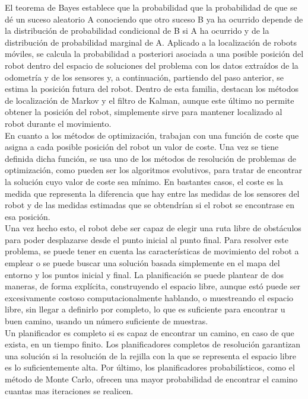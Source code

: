 El teorema de Bayes establece que la probabilidad que la probabilidad de que se dé un suceso aleatorio A conociendo que otro suceso B ya ha ocurrido depende de la distribución de probabilidad condicional de B si A ha ocurrido y de la distribución de probabilidad marginal de A. Aplicado a la localización de robots móviles, se calcula la probabilidad a posteriori asociada a una posible posición del robot dentro del espacio de soluciones del problema con los datos extraídos de la odometría y de los sensores y, a continuación, partiendo del paso anterior, se estima la posición futura del robot. Dentro de esta familia, destacan los métodos de localización de Markov y el filtro de Kalman, aunque este último no permite obtener la posición del robot, simplemente sirve para mantener localizado al robot durante el movimiento.\\

En cuanto a los métodos de optimización, trabajan con una función de coste que asigna a cada posible posición del robot un valor de coste. Una vez se tiene definida dicha función, se usa uno de los métodos de resolución de problemas de optimización, como pueden ser los algoritmos evolutivos, para tratar de encontrar la solución cuyo valor de coste sea mínimo. En bastantes casos, el coste es la medida que representa la diferencia que hay entre las medidas de los sensores del robot y de las medidas estimadas que se obtendrían si el robot se encontrase en esa posición.\\

Una vez hecho esto, el robot debe ser capaz de elegir una ruta libre de obstáculos para poder desplazarse desde el punto inicial al punto final. Para resolver este problema, se puede tener en cuenta las características de movimiento del robot a emplear o se puede buscar una solución basada simplemente en el mapa del entorno  y los puntos inicial y final. La planificación se puede plantear de dos maneras, de forma explícita, construyendo el espacio libre, aunque estó puede ser excesivamente costoso computacionalmente hablando, o muestreando el espacio libre, sin llegar a definirlo por completo, lo que es suficiente para encontrar u buen camino, usando un número suficiente de muestras.\\

Un planificador es completo si es capaz de encontrar un camino, en caso de que exista, en un tiempo finito. Los planificadores completos de resolución garantizan una solución si la resolución de la rejilla con la que se representa el espacio libre es lo suficientemente alta. Por último, los planificadores probabilísticos, como el método de Monte Carlo, ofrecen una mayor probabilidad de encontrar el camino cuantas mas iteraciones se realicen.\\

